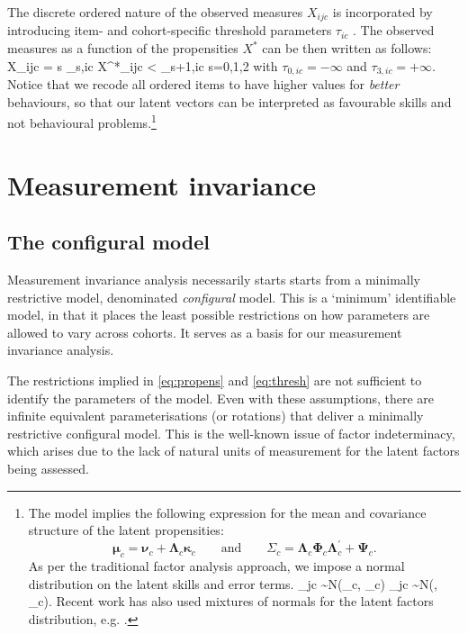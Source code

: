 The discrete ordered nature of the observed measures $X_{ijc}$ is incorporated by introducing item- and cohort-specific threshold parameters $\tau_{ic}$ \citep{Muthen1984}. The observed measures as a function of the propensities $X^*$ can be then written as follows:
\be\label{eq:thresh}
X_{ijc} = s \qquad {} \; \tau_{s,ic} \leq X^*_{ijc} < \tau_{s+1,ic} \qquad {} \; s=0,1,2
\ee
with $\tau_{0,ic}=-\infty$ and $\tau_{3,ic}=+\infty$. Notice that we recode all ordered items to have higher values for \emph{better} behaviours, so that our latent vectors can be interpreted as favourable skills and not behavioural problems.\footnote{The model implies the following expression for the mean and covariance structure of the latent propensities:
$$\bm{\mu}_c=\bm{\nu}_c + \bm{\Lambda}_c\bm{\kappa}_c \qquad \text{and} \qquad \Sigma_c = \bm{\Lambda}_c \bm{\Phi}_c \bm{\Lambda}_c^\prime + \bm{\Psi}_c.$$
As per the traditional factor analysis approach, we impose a normal distribution on the latent skills and error terms. 
\be\label{eq:norm}
\bm{\theta}_{jc} \sim N(\bm{\kappa}_c, \bm{\Phi}_c) \qquad {} \qquad {}_{jc} \sim N(, \bm{\Psi}_c).
\ee
Recent work has also used mixtures of normals for the latent factors distribution, e.g. \citet{Conti2010a}.}



\section{Measurement invariance \label{sec:measinv}}

\subsection{The configural model \label{sec:config}}

Measurement invariance analysis necessarily starts starts from a minimally restrictive model, denominated \emph{configural} model. This is a `minimum' identifiable model, in that it places the least possible restrictions on how parameters are allowed to vary across cohorts. It serves as a basis for our measurement invariance analysis.

The restrictions implied in \eqref{eq:propens} and \eqref{eq:thresh} are not sufficient to identify the parameters of the model. Even with these assumptions, there are infinite equivalent parameterisations (or rotations) that deliver a minimally restrictive configural model. This is the well-known issue of factor indeterminacy, which arises due to the lack of natural units of measurement for the latent factors being assessed.

